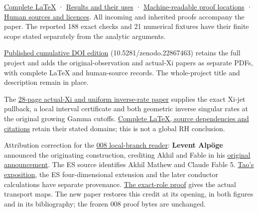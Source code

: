 \documentclass[
]{article}
\begin{document}
\href{https://github.com/KokunoYumeto/zeta-function-research-reader/blob/main/workbenches/splitzero-tandem/continuations/20260921-inverse-quotient/INVERSE_QUOTIENT_COMPLETE_READER.tex}{Complete
LaTeX} ·
\href{https://github.com/KokunoYumeto/zeta-function-research-reader/blob/main/workbenches/splitzero-tandem/continuations/20260921-inverse-quotient/RESULTS_20260921_013.md}{Results
and their uses} ·
\href{https://github.com/KokunoYumeto/zeta-function-research-reader/blob/main/workbenches/splitzero-tandem/continuations/20260921-inverse-quotient/RESULT_INDEX.json}{Machine-readable
proof locations} ·
\href{https://github.com/KokunoYumeto/zeta-function-research-reader/blob/main/workbenches/splitzero-tandem/continuations/20260921-inverse-quotient/THIRD_PARTY_NOTICES.md}{Human
sources and licences}. All incoming and inherited proofs accompany the
paper. The reported 188 exact checks and 21 numerical fixtures have
their finite scope stated separately from the analytic arguments.

\href{https://zenodo.org/records/22867463}{Published cumulative DOI
edition} (10.5281/zenodo.22867463) retains the full project and adds the
original-observation and actual-Xi papers as separate PDFs, with
complete LaTeX and human-source records. The whole-project title and
description remain in place.

The
\href{https://github.com/KokunoYumeto/zeta-function-research-reader/blob/main/workbenches/splitzero-tandem/continuations/20260921-actual-xi-uniform/ACTUAL_XI_UNIFORM_CONDUCTOR.pdf}{28-page
actual-Xi and uniform inverse-rate paper} supplies the exact Xi-jet
pullback, a local interval certificate and both geometric inverse
singular rates at the original growing Gamma cutoffs.
\href{https://github.com/KokunoYumeto/zeta-function-research-reader/blob/main/workbenches/splitzero-tandem/continuations/20260921-actual-xi-uniform/README.md}{Complete
LaTeX, source dependencies and citations} retain their stated domains;
this is not a global RH conclusion.

Attribution correction for the
\href{https://github.com/KokunoYumeto/zeta-function-research-reader/blob/7230c00b9f07dd222b2aea95427d67918f3a8cac/workbenches/splitzero-tandem/continuations/20260921-local-covariance-activation/008/REAL_PAIR_LOCAL_OBJECT.pdf}{008
local-branch reader}: \textbf{Levent Alpöge} announced the originating
construction, crediting Akhil and Fable in his
\href{https://x.com/__alpoge__/status/2079028340955197566}{original
announcement}. The ES source identifies Akhil Mathew and Claude Fable 5.
\href{https://terrytao.wordpress.com/2026/07/21/a-digestion-of-the-jacobian-conjecture-counterexample/}{Tao's
exposition}, the ES four-dimensional extension and the later conductor
calculations have separate provenance.
\href{https://github.com/KokunoYumeto/zeta-function-research-reader/blob/main/workbenches/splitzero-tandem/continuations/20260921-actual-xi-uniform/ALPOGE_FABLE_ROLE.tex}{The
exact-role proof} gives the actual transport maps. The new paper
restores this credit at its opening, in both figures and in its
bibliography; the frozen 008 proof bytes are unchanged.
\end{document}

